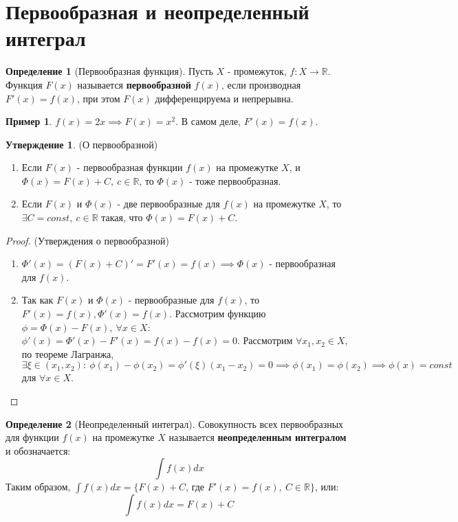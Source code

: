 \documentclass{article}
\theoremstyle{definition}
\newtheorem{definition}{Определение}[section]
\newtheorem{example}{Пример}
\newtheorem{statement}{Утверждение}[section]
\begin{document}
\section{Первообразная и неопределенный интеграл}

\begin{definition}[Первообразная функция]
  Пусть \(X\) - промежуток, \(f:X\rightarrow \mathbb{R}\). Функция \(F(x)\) называется
  \textbf{первообразной} \(f(x)\), если производная \(F'(x) = f(x)\), при этом \(F(x)\)
  дифференцируема и непрерывна.
\end{definition}

\begin{example}
  \(f(x) = 2x \implies F(x) = x^{2}\). В самом деле, \(F'(x) = f(x)\).
\end{example}

\begin{statement}
  (О первообразной)
  \begin{enumerate}
    \item Если \(F(x)\) - первообразная функции \(f(x)\) на промежутке \(X\), и
    \(\varPhi(x) = F(x) + C, \ c \in \mathbb{R}\), то \(\varPhi(x)\) - тоже первообразная.
    \item Если \(F(x)\) и \(\varPhi(x)\) - две первообразные для \(f(x)\) на промежутке \(X\),
    то \(\exists C = const, \ c \in \mathbb{R}\) такая, что \(\varPhi(x) = F(x) + C\). 
  \end{enumerate}
\end{statement}

\begin{proof}
  (Утверждения о первообразной)
  \begin{enumerate}
    \item \(\Phi'(x) = (F(x) + C)' = F'(x) = f(x) \implies \Phi(x)\)
      - первообразная для \(f(x)\).
    \item Так как \(F(x)\) и \(\Phi(x)\) - первообразные для \(f(x)\), то \(F'(x) = f(x),
    \Phi'(x) = f(x)\). Рассмотрим функцию \(\phi = \Phi(x) - F(x), \ \forall x \in X\):
    \(\phi'(x) = \Phi'(x) - F'(x) = f(x) - f(x) = 0\). Рассмотрим
    \(\forall x_{1}, x_{2} \in X\), по теореме Лагранжа, \(\exists \xi \in (x_{1}, x_{2}):
    \ \phi(x_{1}) - \phi(x_{2}) = \phi'(\xi)(x_{1} - x_{2}) = 0 \implies \phi(x_{1}) =
    \phi(x_{2}) \implies \phi(x) = const\) для \(\forall x \in X\).
  \end{enumerate}
\end{proof}

\begin{definition}[Неопределенный интеграл]
  Совокупность всех первообразных для функции \(f(x)\) на промежутке \(X\) называется
  \textbf{неопределенным интегралом} и обозначается:
  \begin{equation*}
    \int f(x) dx
  \end{equation*}
  Таким образом, \(\int f(x) dx = \{F(x) + C\), где \(F'(x) = f(x), \ C \in \mathbb{R}\}\),
  или:
  \begin{equation*}
    \int f(x) dx = F(x) + C
  \end{equation*}
\end{definition}
\end{document}

